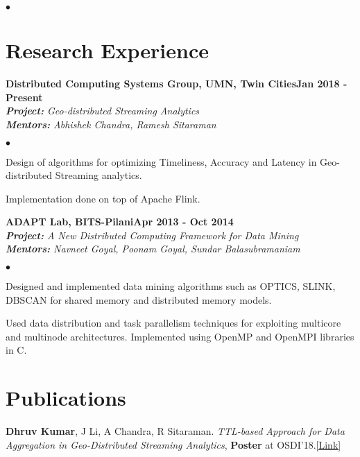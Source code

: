 \documentclass[margin,line]{res}
\newenvironment{list2}{
  \begin{list}{$\bullet$}{%
      \setlength{\itemsep}{0in}
      \setlength{\parsep}{0in} \setlength{\parskip}{0in}
      \setlength{\topsep}{0in} \setlength{\partopsep}{0in} 
      \setlength{\leftmargin}{0.2in}}}{\end{list}}
\begin{document}
\begin{resume}
\begin{list2}
\end{list2}


\section{\sc Research Experience}

{\bf Distributed Computing Systems Group, UMN, Twin Cities}\hfill {\bf Jan 2018 - Present}\\
{\em {\bf Project:} Geo-distributed Streaming Analytics} \\
{\em {\bf Mentors:} Abhishek Chandra, Ramesh Sitaraman}
\vspace{.3cm}
\begin{list2}
	\item Design of algorithms for optimizing Timeliness, Accuracy and Latency in Geo-distributed Streaming analytics.
	\item Implementation done on top of Apache Flink.
\end{list2}

{\bf ADAPT Lab, BITS-Pilani}\hfill {\bf Apr 2013 - Oct 2014}\\
{\em {\bf Project:} A New Distributed Computing Framework for Data Mining} \\
{\em {\bf Mentors:} Navneet Goyal, Poonam Goyal, Sundar Balasubramaniam}
\vspace{.3cm}
\begin{list2}
\item Designed and implemented data mining algorithms such as OPTICS, SLINK, DBSCAN for shared memory and
distributed memory models.
\item Used data distribution and task parallelism techniques for exploiting multicore and multinode
architectures. Implemented using OpenMP and OpenMPI libraries in C.
\end{list2}

\section{\sc Publications}
\textbf{Dhruv Kumar}, J Li, A Chandra, R Sitaraman. {\it TTL-based Approach for Data Aggregation in Geo-Distributed Streaming Analytics}, \textbf{Poster} at OSDI'18.\href{https://drive.google.com/open?id=1NvtkQn05QvFCNMhVhlG9BBjGk5RvOAot}{\color{blue}[Link]}


\end{resume}
\end{document}
